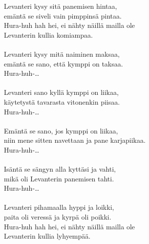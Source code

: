 
            Levanteri kysy sitä panemisen hintaa, \\
            emäntä se siveli vain pimppinsä pintaa. \\
            Hura-huh hah hei, ei nähty näillä mailla ole \\
            Levanterin kullia komiampaa. \\
\hspace{10mm} \\
            Levanteri kysy mitä naiminen maksaa, \\
            emäntä se sano, että kymppi on taksaa. \\
            Hura-huh-… \\
\hspace{10mm} \\
            Levanteri sano kyllä kymppi on liikaa, \\
            käytetystä tavarasta vitonenkin piisaa. \\
            Hura-huh-… \\
\hspace{10mm} \\
            Emäntä se sano, jos kymppi on liikaa, \\
            niin mene sitten navettaan ja pane karjapiikaa. \\
            Hura-huh-… \\
\hspace{10mm} \\
            Isäntä se sängyn alla kyttäsi ja vahti, \\
            mikä oli Levanterin panemisen tahti. \\
            Hura-huh-… \\
\hspace{10mm} \\
            Levanteri pihamaalla hyppi ja loikki, \\
            paita oli veressä ja kyrpä oli poikki. \\
            Hura-huh hah hei, ei nähty näillä mailla ole \\
            Levanterin kullia lyhyempää. \\
